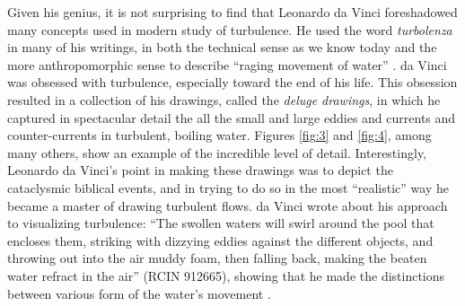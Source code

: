 \documentclass[12pt]{article}
\begin{document}
Given his genius, it is not surprising to find that Leonardo da Vinci foreshadowed many concepts used in modern study of turbulence. He used the word \textit{turbolenza} in many of his writings, in both the technical sense as we know today and the more anthropomorphic sense to describe ``raging movement of water'' \cite{marusic2021leonardo}. da Vinci was obsessed with turbulence, especially toward the end of his life. This obsession resulted in a collection of his drawings, called the \textit{deluge drawings}, in which he captured in spectacular detail the all the small and large eddies and currents and counter-currents in turbulent, boiling water. Figures \ref{fig:3} and \ref{fig:4}, among many others, show an example of the incredible level of detail. Interestingly, Leonardo da Vinci's  point in making these drawings was to depict the cataclysmic biblical events, and in trying to do so in the most ``realistic'' way he became a master of drawing turbulent flows. da Vinci wrote about his approach to visualizing turbulence: ``The swollen waters will swirl around the pool that
encloses them, striking with dizzying eddies against the different objects, and throwing out into the air muddy foam, then falling back, making the beaten water refract in the air'' (RCIN 912665), showing that he made the distinctions between various form of the  water's movement \cite{marusic2021leonardo}. \\
\end{document}
